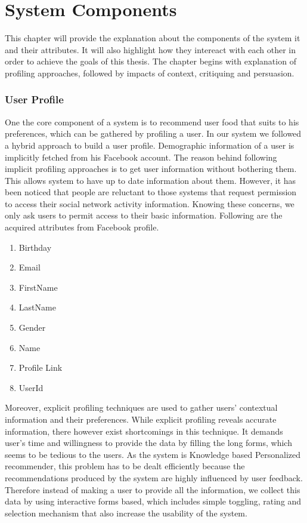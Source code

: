 
\chapter{System Components}

This chapter will provide the explanation about the components of the system it and their attributes. It will also highlight how they intereact with each other in order to achieve the goals of this thesis. The chapter begins with explanation of profiling approaches, followed by impacts of context, critiquing and persuasion.

\subsection{User Profile}

One the core component of a system is to recommend user food that suits to his preferences, which can be gathered by profiling a user. In our system we followed a hybrid approach to build a user profile. Demographic information of a user is implicitly fetched from his Facebook account. The reason behind following implicit profiling approaches is to get user information without bothering them. This allows system to have up to date information about them.  However, it has been noticed that people are reluctant to those systems that request permission to access their social network activity information. Knowing these concerns, we only ask users to permit access to their basic information. Following are the acquired attributes from Facebook profile.

\begin{enumerate}
	\item Birthday
	\item Email	
	\item FirstName
	\item LastName
	\item Gender
	\item Name
	\item Profile Link
	\item UserId
\end{enumerate}

Moreover, explicit profiling techniques are used to gather users' contextual information and their preferences. While explicit profiling reveals accurate information, there however exist shortcomings in this technique. It demands user’s time and willingness to provide the data by filling the long forms, which seems to be tedious to the users. As the system is Knowledge based Personalized recommender, this problem has to be dealt efficiently because the recommendations produced by the system are highly influenced by user feedback. Therefore instead of making a user to provide all the information, we collect this data by using interactive forms based, which includes simple toggling, rating and selection mechanism that also increase the usability of the system.

